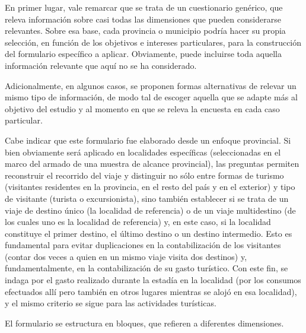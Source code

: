 \documentclass[
]{book}
\begin{document}
En primer lugar, vale remarcar que se trata de un cuestionario genérico, que releva información sobre casi todas las dimensiones que pueden considerarse relevantes. Sobre esa base, cada provincia o municipio podría hacer su propia selección, en función de los objetivos e intereses particulares, para la construcción del formulario específico a aplicar. Obviamente, puede incluirse toda aquella información relevante que aquí no se ha considerado.

Adicionalmente, en algunos casos, se proponen formas alternativas de relevar un mismo tipo de información, de modo tal de escoger aquella que se adapte más al objetivo del estudio y al momento en que se releva la encuesta en cada caso particular.

\hfill\break
Cabe indicar que este formulario fue elaborado desde un enfoque provincial. Si bien obviamente será aplicado en localidades específicas (seleccionadas en el marco del armado de una muestra de alcance provincial), las preguntas permiten reconstruir el recorrido del viaje y distinguir no sólo entre formas de turismo (visitantes residentes en la provincia, en el resto del país y en el exterior) y tipo de visitante (turista o excursionista), sino también establecer si se trata de un viaje de destino único (la localidad de referencia) o de un viaje multidestino (de los cuales uno es la localidad de referencia) y, en este caso, si la localidad constituye el primer destino, el último destino o un destino intermedio. Esto es fundamental para evitar duplicaciones en la contabilización de los visitantes (contar dos veces a quien en un mismo viaje visita dos destinos) y, fundamentalmente, en la contabilización de su gasto turístico. Con este fin, se indaga por el gasto realizado durante la estadía en la localidad (por los consumos efectuados allí pero también en otros lugares mientras se alojó en esa localidad), y el mismo criterio se sigue para las actividades turísticas.

El formulario se estructura en bloques, que refieren a diferentes dimensiones.
\end{document}
